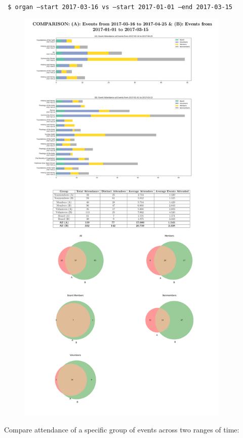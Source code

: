 \documentclass[12pt]{article}
\begin{document}
\texttt{ \$ organ --start 2017-03-16 vs --start 2017-01-01 --end 2017-03-15}
\begin{figure}[H]
    \centering
    \includegraphics[width=4in]{./media/datescomp.pdf}
\end{figure}
\pagebreak

Compare attendance of a specific group of events across two ranges of time:
\end{document}
